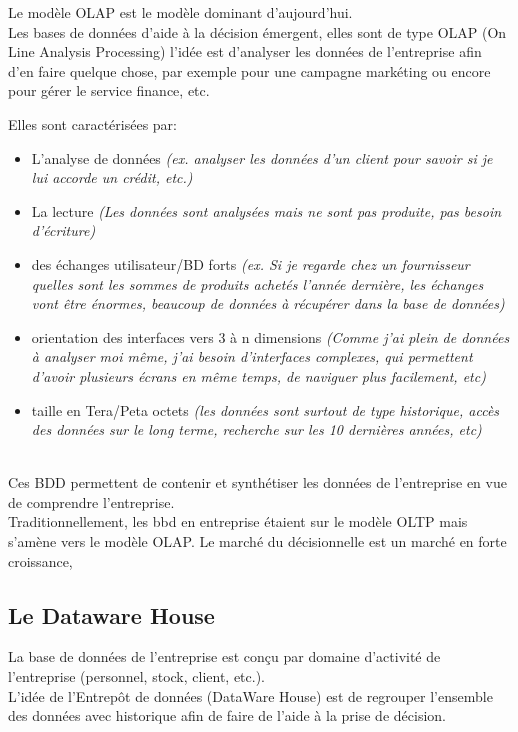 \documentclass[a4paper,11pt]{article}
\begin{document}
		Le modèle OLAP est le modèle dominant d'aujourd'hui. \\
		
		Les bases de données d'aide à la décision émergent, elles sont de type OLAP (On Line Analysis Processing) l'idée est d'analyser les données de l'entreprise afin d'en faire quelque chose, par exemple pour une campagne markéting ou encore pour gérer le service finance, etc. 
		
		Elles sont caractérisées par:
		\begin{itemize}
			\item L'analyse de données \emph{(ex. analyser les données d'un client pour savoir si je lui accorde un crédit, etc.)}
			\item La lecture \emph{(Les données sont analysées mais ne sont pas produite, pas besoin d'écriture)}
			\item des échanges utilisateur/BD forts \emph{(ex. Si je regarde chez un fournisseur quelles sont les sommes de produits achetés l'année dernière, les échanges vont être énormes, beaucoup de données à récupérer dans la base de données)}
			\item orientation des interfaces vers 3 à n dimensions \emph{(Comme j'ai plein de données à analyser moi même, j'ai besoin d'interfaces complexes, qui permettent d'avoir plusieurs écrans en même temps, de naviguer plus facilement, etc)}
			\item taille en Tera/Peta octets \emph{(les données sont surtout de type historique, accès des données sur le long terme, recherche sur les 10 dernières années, etc)}
		\end{itemize}
		~\\
		
		Ces BDD permettent de contenir et synthétiser les données de l'entreprise en vue de comprendre l'entreprise.\\
		
		Traditionnellement, les bbd en entreprise étaient sur le modèle OLTP mais s'amène vers le modèle OLAP. Le marché du décisionnelle est un marché en forte croissance, 
		
		\subsection{Le Dataware House}
		La base de données de l'entreprise est conçu par domaine d'activité de l'entreprise (personnel, stock, client, etc.). \\
		
		L'idée de l’Entrepôt de données (DataWare House) est de regrouper l'ensemble des données avec historique afin de faire de l'aide à la prise de décision.\\
		
\end{document}
